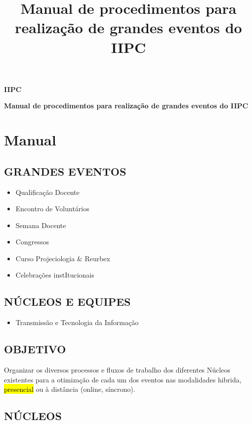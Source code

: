 \documentclass[
]{book}
\title{Manual de procedimentos para realização de grandes eventos do
IIPC}
\author{}
\date{}
\providecommand{\tightlist}{%
  \setlength{\itemsep}{0pt}\setlength{\parskip}{0pt}}
\begin{document}
\frontmatter
\maketitle

{
\setcounter{tocdepth}{0}
\tableofcontents
}
\mainmatter
\textbf{IIPC}

\textbf{Manual de procedimentos para realização de grandes eventos do
IIPC}

\part{Manual}\label{manual}

\chapter{GRANDES EVENTOS}\label{grandes-eventos}

\begin{itemize}
\tightlist
\item
  Qualificação Docente
\item
  Encontro de Voluntários
\item
  Semana Docente
\item
  Congressos
\item
  Curso Projeciologia \& Reurbex
\item
  Celebrações instItucionais
\end{itemize}

\chapter{NÚCLEOS E EQUIPES}\label{nuxfacleos-e-equipes}

\begin{itemize}
\tightlist
\item
  Transmissão e Tecnologia da Informação
\end{itemize}

\chapter{OBJETIVO}\label{objetivo}

Organizar os diversos processos e fluxos de trabalho dos diferentes
Núcleos existentes para a otimização de cada um dos eventos nas
modalidades hibrida, \hl{presencial} ou à distância (online, síncrono).

\chapter{NÚCLEOS}\label{nuxfacleos}
\end{document}

